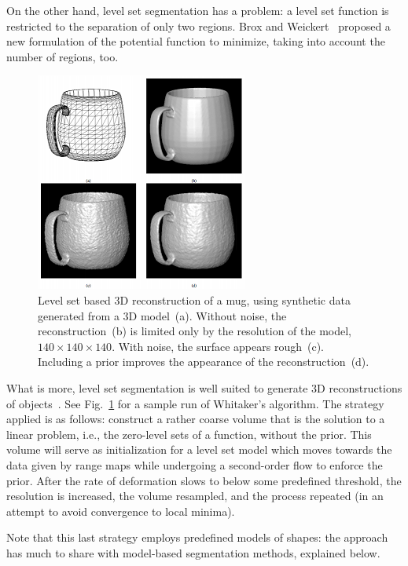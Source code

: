 On the other hand, level set segmentation has a problem: a level set function is restricted to the separation of only two regions. Brox and Weickert~\cite{brox:2004} proposed a new formulation of the potential function to minimize, taking into account the number of regions, too.

\begin{figure}
\centering
\includegraphics{figures/level_set_mug}
\caption[Level set based 3D reconstruction]{Level set based 3D reconstruction of a mug, using synthetic data generated from a 3D model~(a). Without noise, the reconstruction~(b) is limited only by the resolution of the model, $140 \times 140 \times 140$. With noise, the surface appears rough~(c). Including a prior improves the appearance of the reconstruction~(d).%
}
\label{img:level_set_mug}
\end{figure}

What is more, level set segmentation is well suited to generate 3D reconstructions of objects~\cite{whitaker:1998}. See Fig.~\ref{img:level_set_mug} for a sample run of Whitaker's algorithm. The strategy applied is as follows: construct a rather coarse volume that is the solution to a linear problem, i.e., the zero-level sets of a function, without the prior. This volume will serve as initialization for a level set model which moves towards the data given by range maps while undergoing a second-order flow to enforce the prior. After the rate of deformation slows to below some predefined threshold, the resolution is increased, the volume resampled, and the process repeated (in an attempt to avoid convergence to local minima).

Note that this last strategy employs predefined models of shapes: the approach has much to share with model-based segmentation methods, explained below.

